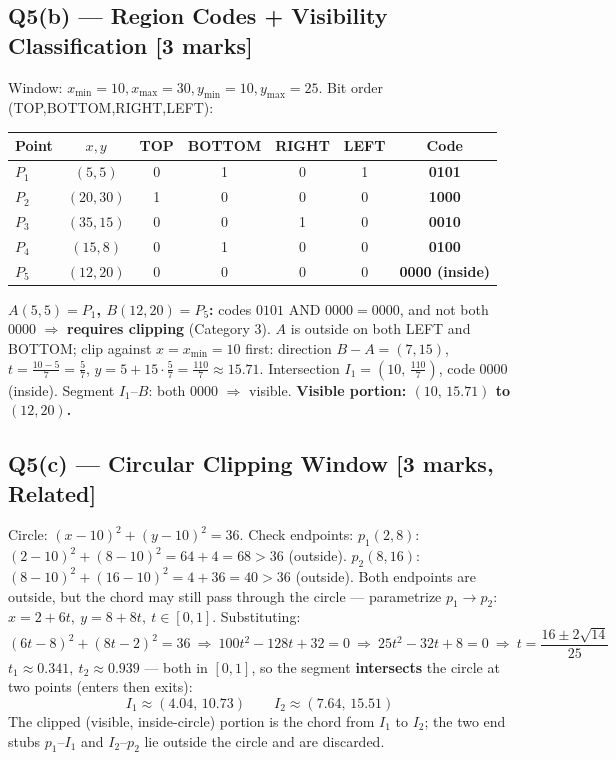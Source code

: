 \documentclass[12pt, a4paper]{article}
\newenvironment{solutionbox}{\begin{mdframed}[style=solutionframe]}{\end{mdframed}}
\begin{document}
\subsection*{Q5(b) --- Region Codes + Visibility Classification [3 marks]}
\begin{solutionbox}
Window: $x_{\min}=10,x_{\max}=30,y_{\min}=10,y_{\max}=25$. Bit order (TOP,BOTTOM,RIGHT,LEFT):
\begin{center}
\begin{tabular}{lcccccc}
\toprule
Point & $x,y$ & TOP & BOTTOM & RIGHT & LEFT & Code \\
\midrule
$P_1$ & $(5,5)$ & 0 & 1 & 0 & 1 & \textbf{0101} \\
$P_2$ & $(20,30)$ & 1 & 0 & 0 & 0 & \textbf{1000} \\
$P_3$ & $(35,15)$ & 0 & 0 & 1 & 0 & \textbf{0010} \\
$P_4$ & $(15,8)$ & 0 & 1 & 0 & 0 & \textbf{0100} \\
$P_5$ & $(12,20)$ & 0 & 0 & 0 & 0 & \textbf{0000 (inside)} \\
\bottomrule
\end{tabular}
\end{center}
\textbf{$A(5,5)=P_1$, $B(12,20)=P_5$:} codes $0101$ AND $0000 = 0000$, and not both $0000$ $\Rightarrow$ \textbf{requires clipping} (Category 3). $A$ is outside on both LEFT and BOTTOM; clip against $x=x_{\min}=10$ first: direction $B-A=(7,15)$, $t=\frac{10-5}{7}=\frac57$, $y=5+15\cdot\frac57=\frac{110}{7}\approx15.71$. Intersection $I_1=(10,\,\tfrac{110}{7})$, code $0000$ (inside). Segment $I_1$--$B$: both $0000$ $\Rightarrow$ visible. \textbf{Visible portion: $(10,\,15.71)$ to $(12,20)$.}
\end{solutionbox}

\subsection*{Q5(c) --- Circular Clipping Window [3 marks, Related]}
\begin{solutionbox}
Circle: $(x-10)^2+(y-10)^2=36$. Check endpoints: $p_1(2,8)$: $(2-10)^2+(8-10)^2=64+4=68>36$ (outside). $p_2(8,16)$: $(8-10)^2+(16-10)^2=4+36=40>36$ (outside). Both endpoints are outside, but the chord may still pass through the circle --- parametrize $p_1\to p_2$: $x=2+6t,\ y=8+8t,\ t\in[0,1]$. Substituting:
$$(6t-8)^2+(8t-2)^2=36 \ \Rightarrow\ 100t^2-128t+32=0 \ \Rightarrow\ 25t^2-32t+8=0 \ \Rightarrow\ t=\frac{16\pm2\sqrt{14}}{25}$$
$t_1\approx0.341,\ t_2\approx0.939$ --- both in $[0,1]$, so the segment \textbf{intersects} the circle at two points (enters then exits):
$$I_1\approx(4.04,\,10.73) \qquad I_2\approx(7.64,\,15.51)$$
The clipped (visible, inside-circle) portion is the chord from $I_1$ to $I_2$; the two end stubs $p_1$--$I_1$ and $I_2$--$p_2$ lie outside the circle and are discarded.
\end{solutionbox}
\end{document}
